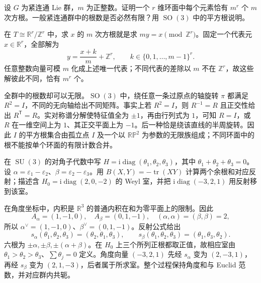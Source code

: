 \begin{exercise}\label{g1:ex:compact-power-map}
	设 \(G\) 为紧连通 Lie 群，\(m\) 为正整数。证明一个 \(r\) 维环面中每个元素恰有 \(m^r\) 个 \(m\) 次方根。一般紧连通群中的根数是否必然有限？用 \(\operatorname{SO}(3)\) 中的平方根说明。
\end{exercise}
\begin{solution}
	在 \(T\cong\mathbb R^r/\mathbb Z^r\) 中，求 \(x\) 的 \(m\) 次方根就是求 \(my=x\pmod{\mathbb Z^r}\)。固定一个代表元 \(x\in\mathbb R^r\)，全部解为
	\[
		y=\frac{x+k}{m}+\mathbb Z^r,
		\qquad k\in\{0,1,\ldots,m-1\}^r.
	\]
	任意整数向量可模 \(m\) 化成上述唯一代表；不同代表的差除以 \(m\) 不在 \(\mathbb Z^r\)，故这些解彼此不同，恰有 \(m^r\) 个。

	全群中的根数却可以无限。\(\operatorname{SO}(3)\) 中，绕任意一条过原点的轴旋转 \(\pi\) 都满足 \(R^2=I\)，不同的无向轴给出不同矩阵。事实上若 \(R^2=I\)，则 \(R^{-1}=R\) 且正交性给出 \(R^{\mathsf T}=R\)。实对称谱分解使特征值全为 \(\pm1\)，再由行列式为 \(1\)，可知 \(R=I\)，或 \(R\) 在一维空间上为 \(1\)、其正交平面上为 \(-1\)。后一种恰是绕该直线的半周旋转。因此 \(I\) 的平方根集合由孤立点 \(I\) 及一个以 \(\mathbb{RP}^2\) 为参数的无限族组成；不同环面中的根不能按单个环面的有限计数合并。
\end{solution}

\begin{exercise}\label{g1:ex:root-height-a2}
	在 \(\operatorname{SU}(3)\) 的对角子代数中写 \(H=\mathrm{i}\operatorname{diag}(\theta_1,\theta_2,\theta_3)\)，其中 \(\theta_1+\theta_2+\theta_3=0\)。设 \(\alpha=\varepsilon_1-\varepsilon_2\)、\(\beta=\varepsilon_2-\varepsilon_3\)。用 \(B(X,Y)=-\operatorname{tr}(XY)\) 计算两个余根和对应反射；描述含 \(H_0=\mathrm{i}\operatorname{diag}(2,0,-2)\) 的 Weyl 室，并把 \(\mathrm{i}\operatorname{diag}(-3,2,1)\) 用反射移到该室。
\end{exercise}
\begin{solution}
	在角度坐标中，内积是 \(\mathbb R^3\) 的普通内积在和为零平面上的限制。因此
	\[
		A_\alpha=(1,-1,0),\quad A_\beta=(0,1,-1),\quad
		(\alpha,\alpha)=(\beta,\beta)=2,
	\]
	所以 \(\alpha^\vee=(1,-1,0)\)、\(\beta^\vee=(0,1,-1)\)。反射公式给出
	\[
		s_\alpha(\theta_1,\theta_2,\theta_3)=(\theta_2,\theta_1,\theta_3),\qquad
		s_\beta(\theta_1,\theta_2,\theta_3)=(\theta_1,\theta_3,\theta_2).
	\]
	六根为 \(\pm\alpha,\pm\beta,\pm(\alpha+\beta)\)。在 \(H_0\) 上三个所列正根都取正值，故相应室由 \(\theta_1>\theta_2>\theta_3\)、\(\sum\theta_j=0\) 定义。角度向量 \((-3,2,1)\) 先经 \(s_\alpha\) 变为 \((2,-3,1)\)，再经 \(s_\beta\) 变为 \((2,1,-3)\)，后者属于所求室。整个过程保持角度和与 Euclid 范数，并对应群内共轭。
\end{solution}

